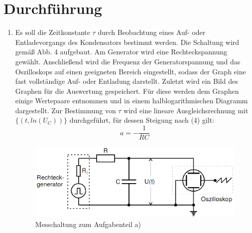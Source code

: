 \section{Durchführung}
\label{sec:Durchführung}


\renewcommand{\labelenumi}{\alph{enumi})}
\begin{enumerate}
  \item Es soll die Zeitkonstante $\tau$ durch Beobachtung eines Auf- oder Entladevorgangs
  des Kondensators bestimmt werden. Die Schaltung wird gemäß Abb. 4 aufgebaut. Am Generator wird eine Rechteckspannung gewählt.
  Anschließend wird die Frequenz der Generatorspannung und das Oszilloskops auf einen
  geeigneten Bereich eingestellt, sodass der Graph eine fast vollständige Auf- oder Entladung darstellt. Zuletzt wird ein Bild des Graphen für die
  Auswertung gespeichert. Für diese werden dem Graphen einige Wertepaare entnommen und in einem
  halblogarithmischen Diagramm dargestellt. Zur Bestimmung von $\tau$ wird eine
  lineare Ausgleichsrechnung mit $\{(t, ln(U_C))\}$ durchgeführt, für dessen Steigung nach (4) gilt:
  \begin{equation}
  a = -\frac{1}{RC}
  \end{equation}
  \begin{figure}[H]
  	\centering
  	\includegraphics[width=\linewidth-200pt,height=\textheight-200pt,keepaspectratio]{content/Aufgabea.png}
  	\caption{Messchaltung zum Aufgabenteil a) \cite{V353}}
  	\label{fig:Aufbaua}
  \end{figure}


\end{enumerate}
